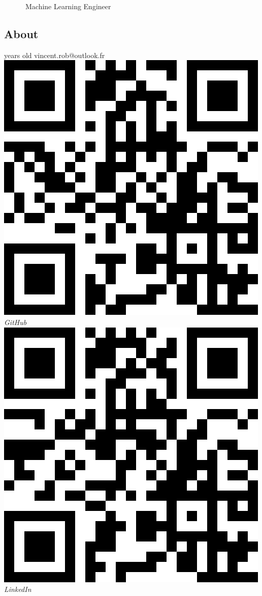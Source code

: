 \documentclass[]{source}
\begin{document}
      {~~~~~~Machine Learning Engineer}

\begin{aside}
\vspace{0.1cm}
\section{About}
\vspace{0.45cm}
	 years old
    vincent.rob@outlook.fr
     \vspace{0.7cm}
	 \includegraphics[scale=0.15]{github.png}
	 \textit{GitHub}
     \vspace{0.6cm}
     \includegraphics[scale=0.15]{linked_in.png}
     \textit{LinkedIn}
\vspace{0.3cm}

\end{aside}
\end{document}
